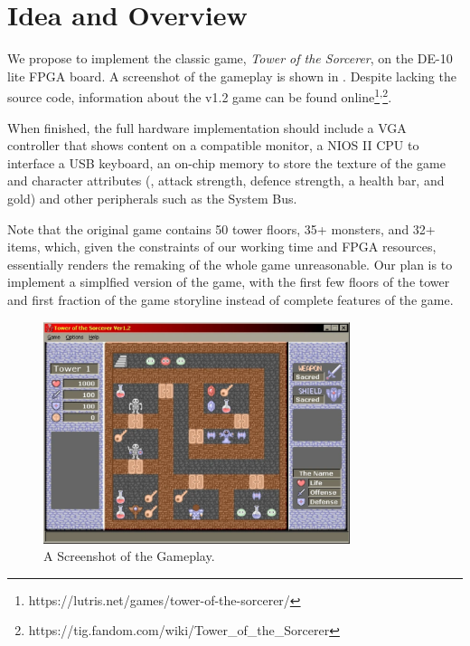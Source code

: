 \documentclass{article}
\begin{document}


\section{Idea and Overview}
We propose to implement the classic game, \textit{Tower of the Sorcerer}, on the DE-10 lite FPGA board. A screenshot of the gameplay is shown in . Despite lacking the source code, information about the v1.2 game can be found online\footnote{https://lutris.net/games/tower-of-the-sorcerer/}\textsuperscript{,}\footnote{https://tig.fandom.com/wiki/Tower\_of\_the\_Sorcerer}. 

When finished, the full hardware implementation should include a VGA controller that shows content on a compatible monitor, a NIOS II CPU to interface a USB keyboard, an on-chip memory to store the texture of the game and character attributes (\eg, attack strength, defence strength, a health bar, and gold) and other peripherals such as the System Bus.

Note that the original game contains 50 tower floors, 35+ monsters, and 32+ items, which, given the constraints of our working time and FPGA resources, essentially renders the remaking of the whole game unreasonable. Our plan is to implement a simplfied version of the game, with the first few floors of the tower and first fraction of the game storyline instead of complete features of the game.

\begin{figure}[h]
    \centering
    \includegraphics[width=0.8\textwidth]{src/tower.png}
    \caption{A Screenshot of the Gameplay.}
    \label{fig:gameplay}
\end{figure}
\end{document}
